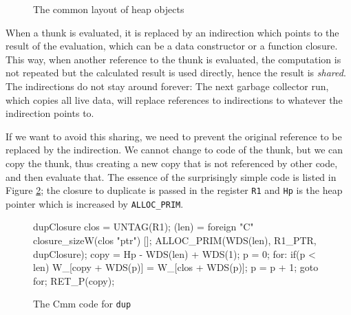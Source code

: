 \documentclass[preprint]{sigplanconf}
\theoremstyle{nonumberplain}
\newcommand{\li}{\lstinline[style=Haskell]}
\newcommand{\ci}{\lstinline[style=Cmm]}
\begin{document}
\def\ux{2.2cm}\def\uy{0.6cm}
\begin{figure}
\begin{center}
\end{center}
\caption{The common layout of heap objects}
\label{fig:heap}
\end{figure}

When a thunk is evaluated, it is replaced by an indirection which points to the result of the evaluation, which can be a data constructor or a function closure. This way, when another reference to the thunk is evaluated, the computation is not repeated but the calculated result is used directly, hence the result is \emph{shared}. The indirections do not stay around forever: The next garbage collector run, which copies all live data, will replace references to indirections to whatever the indirection points to.

If we want to avoid this sharing, we need to prevent the original reference to be replaced by the indirection. We cannot change to code of the thunk, but we can copy the thunk, thus creating a new copy that is not referenced by other code, and then evaluate that.
The essence of the surprisingly simple code is listed in Figure \ref{fig:dupcode}; the closure to duplicate is passed in the register \ci-R1- and \ci-Hp- is the heap pointer which is increased by \ci-ALLOC_PRIM-.

\begin{figure}
\begin{cmm}
dupClosure {
    clos = UNTAG(R1);
    (len) = foreign "C" closure_sizeW(clos "ptr") [];
    ALLOC_PRIM(WDS(len), R1_PTR, dupClosure);
    copy = Hp - WDS(len) + WDS(1);
    p = 0;
    for:
    if(p < len) {
        W_[copy + WDS(p)] = W_[clos + WDS(p)];
        p = p + 1;
        goto for;
    }
    RET_P(copy);
}
\end{cmm}
\caption{The Cmm code for \li-dup-}
\label{fig:dupcode}
\end{figure}
\end{document}
